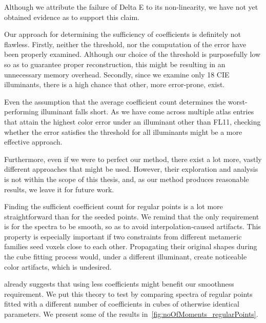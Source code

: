 Although we attribute the failure of Delta E to its non-linearity, we have not yet obtained evidence as to support this claim.

Our approach for determining the sufficiency of coefficients is definitely not flawless. Firstly, neither the threshold, nor the computation of the error have been properly examined. Although our choice of the threshold is purposefully low so as to guarantee proper reconstruction, this might be resulting in an unnecessary memory overhead. Secondly, since we examine only 18 CIE illuminants, there is a high chance that other, more error-prone, exist.

Even the assumption that the average coefficient count determines the worst-performing illuminant falls short. As we have come across multiple atlas entries that attain the highest color error under an illuminant other than FL11, checking whether the error satisfies the threshold for all illuminants might be a more effective approach.

Furthermore, even if we were to perfect our method, there exist a lot more, vastly different approaches that might be used. However, their exploration and analysis is not within the scope of this thesis, and, as our method produces reasonable results, we leave it for future work.

Finding the sufficient coefficient count for regular points is a lot more straightforward than for the seeded points. We remind that the only requirement is for the spectra to be smooth, so as to avoid interpolation-caused artifacts. This property is especially important if two constraints from different metameric families seed voxels close to each other. Propagating their original shapes during the cube fitting process would, under a different illuminant, create noticeable color artifacts, which is undesired.

 already suggests that using less coefficients might benefit our smoothness requirement. We put this theory to test by comparing spectra of regular points fitted with a different number of coefficients in cubes of otherwise identical parameters. We present some of the results in~\cref{fig:noOfMoments_regularPoints}.

